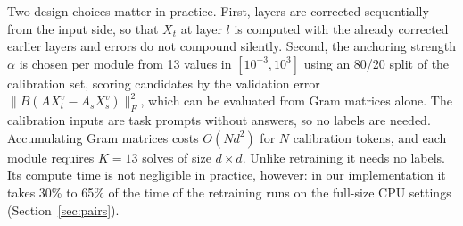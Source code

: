 \documentclass[preprint,12pt,authoryear]{elsarticle}
\begin{document}
Two design choices matter in practice. First, layers are corrected sequentially from the input side, so that $X_t$ at
layer $l$ is computed with the already corrected earlier layers and errors do not compound silently. Second, the
anchoring strength $\alpha$ is chosen per module from 13 values in $[10^{-3},10^{3}]$ using an 80/20 split of the
calibration set, scoring candidates by the validation error $\|B(AX_t^{v}-A_sX_s^{v})\|_F^2$, which can be evaluated from
Gram matrices alone. The calibration inputs are task prompts without answers, so no labels are needed.
Accumulating Gram matrices costs $O(Nd^2)$ for $N$ calibration tokens, and each module requires $K=13$ solves of size
$d\times d$. Unlike retraining it needs no labels. Its compute time is not negligible in practice, however: in our
implementation it takes 30\% to 65\% of the time of the retraining runs on the full-size CPU settings (Section~\ref{sec:pairs}).
\end{document}
